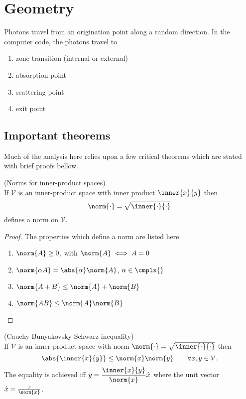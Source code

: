 \section{\label{sec:geometry}Geometry}

Photons travel from an origination point along a random direction. In the computer code, the photons travel to 
%
\begin{enumerate}
\item zone transition (internal or external)
\item absorption point
\item scattering point
\item exit point
\end{enumerate}

\subsection{Important theorems}
Much of the analysis here relies upon a few critical theorems which are stated with brief proofs bellow.
\begin{myTheorem}(Norms for inner-product spaces)\\
If $\mathcal{V}$ is an inner-product space with inner product $\inner{x}{y}$ then
\begin{equation}
  \norm{\cdot} = \sqrt{\inner{\cdot}{\cdot}}
\end{equation}
defines a norm on $\mathcal{V}$.
\end{myTheorem}
\begin{proof}
The properties which define a norm are listed here.
\begin{enumerate}
%
\item $\norm{A}\ge 0$, with $\norm{A}\iff A=0$
%
\item $\norm{\alpha A} = \abs{\alpha}\norm{A}$, $\alpha\in\cmplx{}$
%
\item $\norm{A + B} \le \norm{A} + \norm{B}$
%
\item $\norm{A B} \le \norm{A} \norm{B}$
%
\end{enumerate}
\end{proof}
\begin{myTheorem}(Cauchy-Bunyakovsky-Schwarz inequality)\\
If $\mathcal{V}$ is an inner-product space with norm $\norm{\cdot} = \sqrt{\inner{\cdot}{\cdot}}$ then
\begin{equation}
  \abs{ \inner{x}{y} } \le \norm{x} \norm{y} \qquad \forall x,y \in \mathcal{V}.
\end{equation}
The equality is achieved iff $\displaystyle{y = \frac{\inner{x}{y}}{\norm{x}}} \hat{x}$ where the unit vector $\hat{x} = \frac{x}{\norm{x}}$.
\end{myTheorem}
